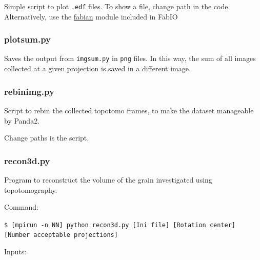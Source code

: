 \documentclass[11pt]{scrartcl}
\begin{document}
Simple script to plot {\texttt{.edf}} files. To show a file, change path in the code. Alternatively, use the \href{https://sourceforge.net/p/fable/wiki/fabian/}{fabian} module included in FabIO \cite{knudsen2013fabio}

\subsubsection{plot\textunderscore sum.py}
\label{sub_s:plot_sum}

Saves the output from {\texttt{img\textunderscore sum.py}} in {\texttt{png}} files. In this way, the sum of all images collected at a given projection is saved in a different image.

\subsubsection{rebin\textunderscore img.py}
\label{sub_s:rebin}

Script to rebin the collected topotomo frames, to make the dataset manageable by Panda2.

\danger Change paths is the script.

\subsubsection{recon3d.py}

Program to reconstruct the volume of the grain investigated using topotomography.

Command:

{\texttt{\$ [mpirun -n NN] python recon3d.py [Ini file] [Rotation center] [Number acceptable projections]}}

Inputs:
\end{document}
